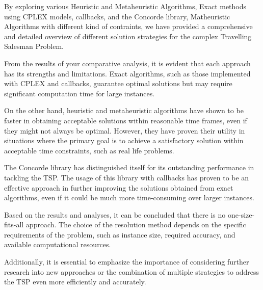 By exploring various Heuristic and Metaheuristic Algorithms, Exact methods using CPLEX models, callbacks, and the Concorde library, Matheuristic Algorithms with different kind of contraints, we have provided a comprehensive and detailed overview of different solution strategies for the complex Travelling Salesman Problem.

From the results of your comparative analysis, it is evident that each approach has its strengths and limitations. Exact algorithms, such as those implemented with CPLEX and callbacks, guarantee optimal solutions but may require significant computation time for large instances.

On the other hand, heuristic and metaheuristic algorithms have shown to be faster in obtaining acceptable solutions within reasonable time frames, even if they might not always be optimal. However, they have proven their utility in situations where the primary goal is to achieve a satisfactory solution within acceptable time constraints, such as real life problems.

The Concorde library has distinguished itself for its outstanding performance in tackling the TSP. The usage of this library with callbacks has proven to be an effective approach in further improving the solutions obtained from exact algorithms, even if it could be much more time-consuming over larger instances.

Based on the results and analyses, it can be concluded that there is no one-size-fits-all approach. The choice of the resolution method depends on the specific requirements of the problem, such as instance size, required accuracy, and available computational resources.

Additionally, it is essential to emphasize the importance of considering further research into new approaches or the combination of multiple strategies to address the TSP even more efficiently and accurately.